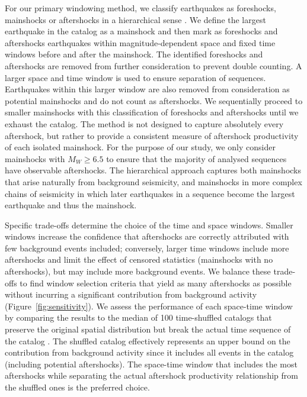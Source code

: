 \documentclass[draft, jgrga]{agujournal2018}
\begin{document}
For our primary windowing method, we classify earthquakes as foreshocks, mainshocks or aftershocks in a hierarchical sense \citep[following][]{felzer2006decay, Brodsky2011TheForeshocks, Wetzler2016, Garza-Giron2018Mainshock-AftershockRegions}. We define the largest earthquake in the catalog as a mainshock and then mark as foreshocks and aftershocks earthquakes within magnitude-dependent space and fixed time windows before and after the mainshock. The identified foreshocks and aftershocks are removed from further consideration to prevent double counting. A larger space and time window is used to ensure separation of sequences. Earthquakes within this larger window are also removed from consideration as potential mainshocks and do not count as aftershocks. We sequentially proceed to smaller mainshocks with this classification of foreshocks and aftershocks until we exhaust the catalog. The method is not designed to capture absolutely every aftershock, but rather to provide a consistent measure of aftershock productivity of each isolated mainshock. For the purpose of our study, we only consider mainshocks with $M_W\ge6.5$ to ensure that the majority of analysed sequences have observable aftershocks. The hierarchical approach captures both mainshocks that arise naturally from background seismicity, and mainshocks in more complex chains of seismicity in which later earthquakes in a sequence become the largest earthquake and thus the mainshock.

Specific trade-offs determine the choice of the time and space windows. Smaller windows increase the confidence that aftershocks are correctly attributed with few background events included; conversely, larger time windows include more aftershocks and limit the effect of censored statistics (mainshocks with no aftershocks), but may include more background events. We balance these trade-offs to find window selection criteria that yield as many aftershocks as possible without incurring a significant contribution from background activity (Figure~\ref{fig:sensitivity}). We assess the performance of each space-time window by comparing the results to the median of 100 time-shuffled catalogs that preserve the original spatial distribution but break the actual time sequence of the catalog \citep{Garza-Giron2018Mainshock-AftershockRegions}. The shuffled catalog effectively represents an upper bound on the contribution from background activity since it includes all events in the catalog (including potential aftershocks). The space-time window that includes the most aftershocks while separating the actual aftershock productivity relationship from the shuffled ones is the preferred choice.
\end{document}
